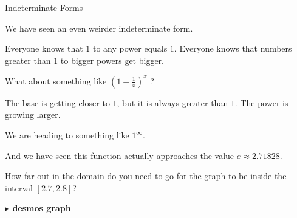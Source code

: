 \documentclass{ximera}
\begin{document}
\begin{example} Indeterminate Forms

We have seen an even weirder indeterminate form.

Everyone knows that $1$ to any power equals $1$. Everyone knows that numbers greater than $1$ to bigger powers get bigger.


What about something like $\left( 1 + \frac{1}{x} \right)^x$ ?

The base is getting closer to $1$, but it is always greater than $1$.  The power is growing larger.  

We are heading to something like $1^{\infty}$.

And we have seen this function actually approaches the value $e \approx 2.71828$. 

How far out in the domain do you need to go for the graph to be inside the interval $[2.7, 2.8]$?











\begin{image}
\end{image}









\begin{onlineOnly}
\textbf{\textcolor{blue!55!black}{$\blacktriangleright$ desmos graph}} 
\begin{center}
\end{center}
\end{onlineOnly}






\end{example}
\end{document}
